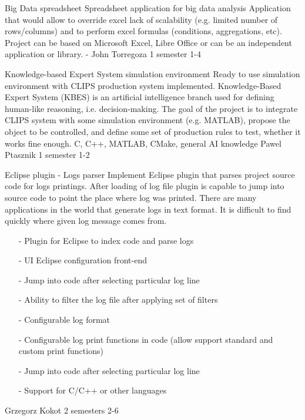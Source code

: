 \begin{project}
{Big Data spreadsheet}
{Spreadsheet application for big data analysis} 
{ 
Application that would allow to override excel lack of scalability (e.g. limited
number of rows/columns) and to perform excel formulas (conditions, aggregations,
etc). Project can be based on Microsoft Excel, Libre Office or can be an
independent application or library.
} 
{-}
{John Torregoza}
{1 semester}
{1-4}
\end{project}
\begin{project}
{Knowledge-based Expert System simulation environment}
{Ready to use simulation environment with CLIPS production system implemented.}
{
Knowledge-Based Expert System (KBES) is an artificial intelligence branch used for defining human-like reasoning, i.e. decision-making. The goal of the project is to integrate CLIPS system with some simulation environment (e.g. MATLAB), propose the object to be controlled, and define some set of production rules to test, whether it works fine enough. }
{C, C++, MATLAB, CMake, general AI knowledge}
{Pawel Ptasznik}
{1 semester}
{1-2}
\end{project}
\begin{project}
{Eclipse plugin - Logs parser}
{
Implement Eclipse plugin that parses project source code for logs printings.
After loading of log file plugin is capable to jump into source code to point
the place where log was printed.
There are many applications in the world that generate logs in text format. It is difficult to find quickly where given log message comes from. 
}
{
 \begin{itemize}
  \item[-] Plugin for Eclipse to index code and parse logs
  \item[-] UI Eclipse configuration front-end
  \item[-] Jump into code after selecting particular log line
  \item[-] Ability to filter the log file after applying set of filters
\end{itemize}
}
{
 \begin{itemize}
  \item[-] Configurable log format
  \item[-] Configurable log print functions in code (allow support standard and custom print functions)
  \item[-] Jump into code after selecting particular log line
  \item[-] Support for C/C++ or other languages
\end{itemize}
}
{Grzegorz Kokot}
{2 semesters}
{2-6}
\end{project}
